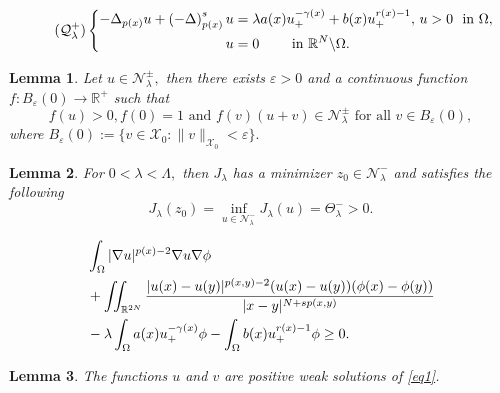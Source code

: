 \documentclass[10pt,a4paper]{amsart}
\newtheorem{lemma}{Lemma}
\newcommand{\De} {\Delta}
\newcommand{\La} {\Lambda}
\newcommand{\Nh}{\mathcal{N}_\la}
\newcommand{\R}{\mathbb{R}}
\newcommand{\Th} {\Theta}
\newcommand{\X}{\mathcal{X}_{0}}
\newcommand{\ga} {\gamma}
\newcommand{\grad}{\nabla}
\newcommand{\la} {\lambda}
\newcommand{\lb}{\left(}
\newcommand{\na} {\nabla}
\newcommand{\om} {\Omega}
\newcommand{\ra} {\rightarrow}
\newcommand{\rb}{\right)}
\newcommand{\rnn}{\mathbb{R}^{N}}
\begin{document}
\begin{equation}\label{eq2}\tag{$\mathcal{Q}^+_{\lambda}$}
   \left\{
	\begin{aligned}
		-\De_{p(x)}u+\lb -\De \rb^s_{p(x)}u 
&=\lambda a(x)u_+^{-\gamma(x)}+b(x)u_+^{r(x)-1},\,
 u>0 \  \text{ in } \om,\\
u &= 0 \qquad \text{ in } \rnn\backslash\om.
	\end{aligned}
    \right.
\end{equation}

\begin{lemma}\label{lm9}
    Let $u\in \mathcal{N}_\la^\pm,$
then there exists $\varepsilon>0$
and a continuous function 
$f:B_\varepsilon(0)\ra \R^+$
such that
$$
    f(u)>0, f(0)=1 \text{ and } 
    f(v)(u+v)\in \mathcal{N}_\la^\pm 
    \text{ for all } v\in B_\varepsilon(0),
$$
    where $B_\varepsilon(0):=
    \{v\in \X:\|v\|_{\X}<\varepsilon\}.$
\end{lemma}

\begin{lemma}\label{lm:min_neg}
    For $0<\la<\La,$
then $J_\la$
has a minimizer $z_0\in \Nh^-$
and satisfies the following
$$
    J_\la(z_0)=
    \inf_{u\in \mathcal{N}_\la^-}J_\la(u)=\Th_\la^->0.
$$
\end{lemma}

\begin{align}\label{eq16}
&
\int_\om|\grad u|^{p(x)-2}\na u\na\phi \notag \\
& +
 \iint_{\mathbb{R}^{2N}} 
\frac{|u(x)-u(y)|^{p(x,y)-2}(u(x)-u(y))
(\phi(x)-\phi(y))}{|x-y|^{N+sp(x,y)}}\nonumber\\
    &-\la
\int_\om a(x)u_+^{-\ga(x)}\phi -
\int_\om b(x)u_+^{r(x)-1}\phi\ge0.
    \end{align}

\begin{lemma}\label{lm:existence_result}
    The functions $u$
and $v$
are positive weak solutions of \eqref{eq1}.
\end{lemma}
\end{document}

